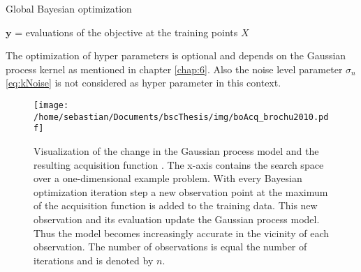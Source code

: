 \begin{algorithm}
    \caption{Global Bayesian optimization\label{alg:boGlob}}
    \BlankLine

    $\mathbf{y}$ = evaluations of the objective at the training points $X$\\
\end{algorithm}

The optimization of hyper parameters is optional and depends on the Gaussian process kernel as mentioned in chapter \ref{chap:6}. Also the noise level parameter $\sigma_n$ \eqref{eq:kNoise} is not considered as hyper parameter in this context.

\begin{figure}[h]
    \centering
    \texttt{[image: /home/sebastian/Documents/bscThesis/img/boAcq\_brochu2010.pdf]}
    \caption{Visualization of the change in the Gaussian process model and the resulting acquisition function \cite{brochu2010tutorial}. The x-axis contains the search space over a one-dimensional example problem. With every Bayesian optimization iteration step a new observation point at the maximum of the acquisition function is added to the training data. This new observation and its evaluation update the Gaussian process model. Thus the model becomes increasingly accurate in the vicinity of each observation. The number of observations is equal the number of iterations and is denoted by $n$. \label{fig:acqBO}}
\end{figure}

